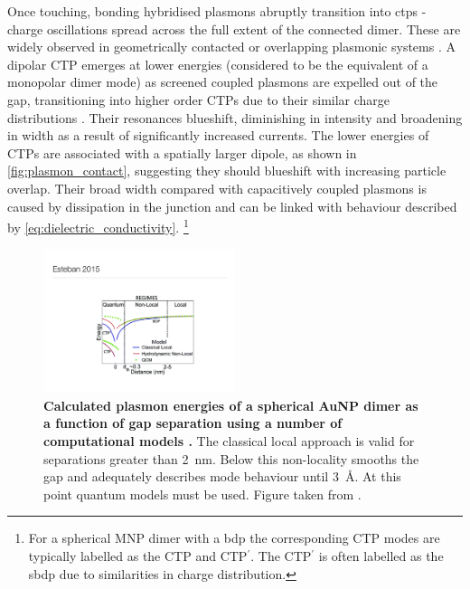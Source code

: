 \documentclass{article}
\begin{document}
Once touching, bonding hybridised plasmons abruptly transition into \glspl{ctp} - charge oscillations spread across the full extent of the connected dimer. These are widely observed in geometrically contacted or overlapping plasmonic systems \cite{atay2004, lassiter2008}. A dipolar CTP emerges at lower energies (considered to be the equivalent of a monopolar dimer mode) as screened coupled plasmons are expelled out of the gap, transitioning into higher order CTPs due to their similar charge distributions \cite{romero2006, perez2010, perez2011, tserkezis2014}. Their resonances blueshift, diminishing in intensity and broadening in width as a result of significantly increased currents. The lower energies of CTPs are associated with a spatially larger dipole, as shown in \autoref{fig:plasmon_contact}, suggesting they should blueshift with increasing particle overlap. Their broad width compared with capacitively coupled plasmons is caused by dissipation in the junction and can be linked with behaviour described by \eqref{eq:dielectric_conductivity}.%
\footnote{For a spherical MNP dimer with a \gls{bdp} the corresponding CTP modes are typically labelled as the CTP and CTP$^\prime$. The CTP$^\prime$ is often labelled as the \gls{sbdp} due to similarities in charge distribution.} 

\begin{figure}[bt]
\centering
\includegraphics[width=0.5\textwidth]{figures/literature/esteban2015a}
\caption[Calculated plasmon energies of a spherical AuNP dimer as a function of gap separation using a number of computational models \cite{esteban2015}]{\textbf{Calculated plasmon energies of a spherical AuNP dimer as a function of gap separation using a number of computational models \cite{esteban2015}.} The classical local approach is valid for separations greater than \SI{2}{nm}. Below this non-locality smooths the gap and adequately describes mode behaviour until \SI{3}{\angstrom}. At this point quantum models must be used. Figure taken from \cite{esteban2015}.}
\label{fig:model_comparison}
\end{figure}
\end{document}
